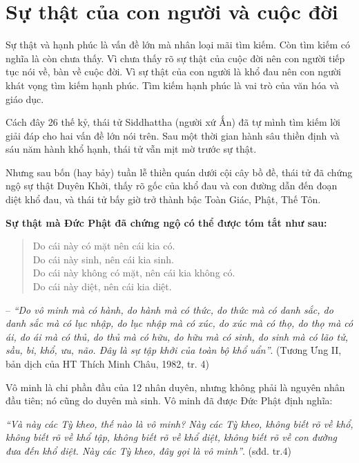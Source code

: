 \chapter{Sự thật của con người và cuộc đời} %
\label{cha:su_that_cua_con_nguoi_va_cuoc_doi}

Sự thật và hạnh phúc là vấn đề lớn mà nhân loại mãi tìm kiếm. Còn tìm kiếm có nghĩa là còn chưa thấy. Vì chưa thấy rõ sự thật của cuộc đời nên con người tiếp tục nói về, bàn về cuộc đời. Vì sự thật của con người là khổ đau nên con người khát vọng tìm kiếm hạnh phúc. Tìm kiếm hạnh phúc là vai trò của văn hóa và giáo dục.

Cách đây 26 thế kỷ, thái tử Siddhattha (người xứ Ấn) đã tự mình tìm kiếm lời giải đáp cho hai vấn đề lớn nói trên. Sau một thời gian hành sâu thiền định và sáu năm hành khổ hạnh, thái tử vẫn mịt mờ trước sự thật.

Nhưng sau bốn (hay bảy) tuần lễ thiền quán dưới cội cây bồ đề, thái tử đã chứng ngộ sự thật Duyên Khởi, thấy rõ gốc của khổ đau và con đường dẫn đến đoạn diệt khổ đau, và thái tử bấy giờ trở thành bậc Toàn Giác, Phật, Thế Tôn.

\hrulefill

{\bf Sự thật mà Đức Phật đã chứng ngộ có thể được tóm tắt như sau:}

\begin{verse}
\begin{itshape}
Do cái này có mặt nên cái kia có.\\
Do cái này sinh, nên cái kia sinh.\\
Do cái này không có mặt, nên cái kia không có.\\
Do cái này diệt, nên cái kia diệt.
\end{itshape}
\end{verse}

-- \emph{``Do vô minh mà có hành, do hành mà có thức, do thức mà có danh sắc, do danh sắc mà có lục nhập, do lục nhập mà có xúc, do xúc mà có thọ, do thọ mà có ái, do ái mà có thủ, do thủ mà có hữu, do hữu mà có sinh, do sinh mà có lão tử, sầu, bi, khổ, ưu, não. Đây là sự tập khởi của toàn bộ khổ uẩn''}. (Tương Ưng II, bản dịch của HT Thích Minh Châu, 1982, tr. 4)

\hrulefill

Vô minh là chi phần đầu của 12 nhân duyên, nhưng không phải là nguyên nhân đầu tiên; nó cũng do duyên mà sinh. Vô minh đã được Đức Phật định nghĩa:

\emph{``Và này các Tỳ kheo, thế nào là vô minh? Này các Tỳ kheo, không biết rõ về khổ, không biết rõ về khổ tập, không biết rõ về khổ diệt, không biết rõ về con đường đưa đến khổ diệt. Này các Tỳ kheo, đây gọi là vô minh''}. (sđd. tr.4)

